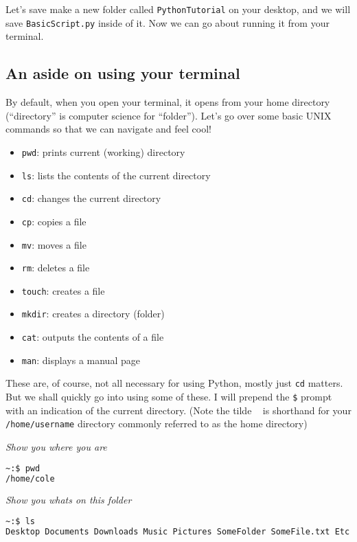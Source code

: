 \documentclass[12pt, twoside, reqno]{book}
\begin{document}
Let's save make a new folder called \texttt{PythonTutorial} on your desktop, and we will save \texttt{BasicScript.py} inside of it. Now we can go about running it from your terminal.

\subsection{An aside on using your terminal}

By default, when you open your terminal, it opens from your home directory (``directory'' is computer science for ``folder''). Let's go over some basic UNIX commands so that we can navigate and feel cool!

\begin{itemize}[itemsep=2px, parsep=0pt]
\item \texttt{pwd}: prints current (working) directory
\item \texttt{ls}: lists the contents of the current directory
\item \texttt{cd}: changes the current directory
\item \texttt{cp}: copies a file
\item \texttt{mv}: moves a file
\item \texttt{rm}: deletes a file
\item \texttt{touch}: creates a file
\item \texttt{mkdir}: creates a directory (folder)
\item \texttt{cat}: outputs the contents of a file
\item \texttt{man}: displays a manual page
\end{itemize}

These are, of course, not all necessary for using Python, mostly just \texttt{cd} matters. But we shall quickly go into using some of these. I will prepend the \texttt{\$} prompt with an indication of the current directory. (Note the tilde \texttt{~} is shorthand for your \texttt{/home/username} directory commonly referred to as the home directory)

\textit{Show you where you are}
\begin{lstlisting}[language=sh]
~:$ pwd     
/home/cole
\end{lstlisting}

\textit{Show you whats on this folder}
\begin{lstlisting}[language=sh]
~:$ ls      
Desktop Documents Downloads Music Pictures SomeFolder SomeFile.txt Etc.md
\end{lstlisting}
\end{document}
